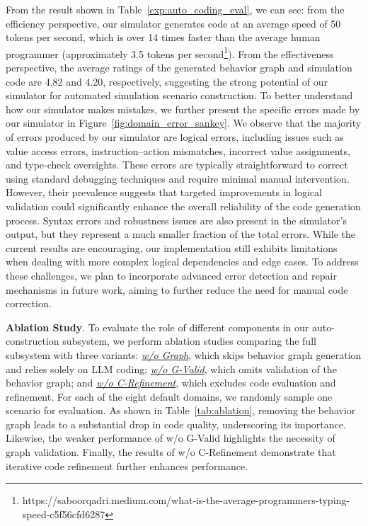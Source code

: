 \documentclass{article}
\theoremstyle{definition}
\theoremstyle{theorem}
\theoremstyle{proof}
\theoremstyle{remark}
\begin{document}
    From the result shown in Table~\ref{exp:auto_coding_eval}, we can see:
    from the efficiency perspective, our simulator generates code at an average speed of 50 tokens per second, which is over 14 times faster than the average human programmer (approximately 3.5 tokens per second\footnote{https://saboorqadri.medium.com/what-is-the-average-programmers-typing-speed-c5f56cfd6287}).
    From the effectiveness perspective, the average ratings of the generated behavior graph and simulation code are 4.82 and 4.20, respectively, suggesting the strong potential of our simulator for automated simulation scenario construction.
    To better understand how our simulator makes mistakes, we further present the specific errors made by our simulator in Figure~\ref{fig:domain_error_sankey}.
    We observe that the majority of errors produced by our simulator are logical errors, including issues such as value access errors, instruction–action mismatches, incorrect value assignments, and type-check oversights. These errors are typically straightforward to correct using standard debugging techniques and require minimal manual intervention. However, their prevalence suggests that targeted improvements in logical validation could significantly enhance the overall reliability of the code generation process. Syntax errors and robustness issues are also present in the simulator’s output, but they represent a much smaller fraction of the total errors. While the current results are encouraging, our implementation still exhibits limitations when dealing with more complex logical dependencies and edge cases. To address these challenges, we plan to incorporate advanced error detection and repair mechanisms in future work, aiming to further reduce the need for manual code correction.


    \textbf{Ablation Study}.
    To evaluate the role of different components in our auto-construction subsystem, we perform ablation studies comparing the full subsystem with three variants: 
    \underline{\textit{w/o Graph}}, which skips behavior graph generation and relies solely on LLM coding; 
    \underline{\textit{w/o G-Valid}}, which omits validation of the behavior graph; and \underline{\textit{w/o C-Refinement}}, which excludes code evaluation and refinement.
    For each of the eight default domains, we randomly sample one scenario for evaluation. As shown in Table~\ref{tab:ablation}, removing the behavior graph leads to a substantial drop in code quality, underscoring its importance. Likewise, the weaker performance of w/o G-Valid highlights the necessity of graph validation. Finally, the results of w/o C-Refinement demonstrate that iterative code refinement further enhances performance.
    
\end{document}
